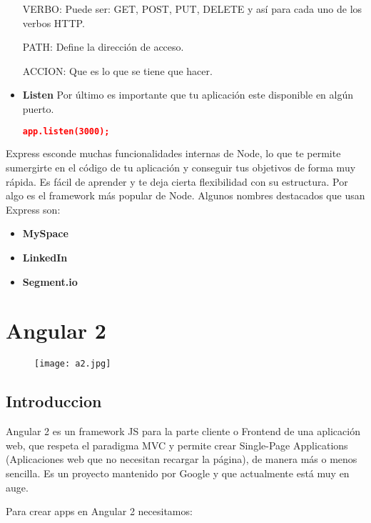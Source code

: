 \begin{itemize}
   VERBO: Puede ser: GET, POST, PUT, DELETE y así para cada uno de los verbos HTTP. 
   
   PATH: Define la dirección de acceso.
   
   ACCION: Que es lo que se tiene que hacer.
   
   \item \textbf{Listen} Por último es importante que tu aplicación este disponible en algún puerto.
   \begin{lstlisting}[language=JSON] 
    app.listen(3000);
   \end{lstlisting}
   
\end{itemize}

Express esconde muchas funcionalidades internas de Node, lo que te permite sumergirte en el código de tu aplicación y conseguir tus objetivos de forma muy rápida. Es fácil de aprender y te deja cierta flexibilidad con su estructura.
Por algo es el framework más popular de Node. Algunos nombres destacados que usan Express son:

\begin{itemize}

\item \textbf{MySpace}
\item \textbf{LinkedIn}
\item \textbf{Segment.io}
\end{itemize}



\section{Angular 2}

\begin{figure}[H]
    \centering
    \texttt{[image: a2.jpg]}
\end{figure}


\subsection{Introduccion}

Angular 2 es un framework JS para la parte cliente o Frontend de una aplicación web, que respeta el paradigma MVC y permite crear Single-Page Applications (Aplicaciones web que no necesitan recargar la página), de manera más o menos sencilla. Es un proyecto mantenido por Google y que actualmente está muy en auge.

Para crear apps en Angular 2 necesitamos:

